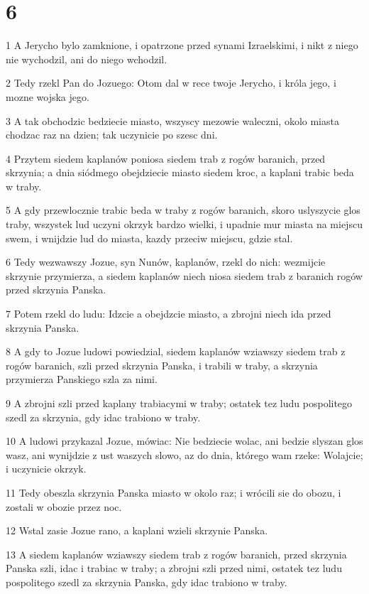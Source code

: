 \chapter{6}

\par 1 A Jerycho bylo zamknione, i opatrzone przed synami Izraelskimi, i nikt z niego nie wychodzil, ani do niego wchodzil.
\par 2 Tedy rzekl Pan do Jozuego: Otom dal w rece twoje Jerycho, i króla jego, i mozne wojska jego.
\par 3 A tak obchodzic bedziecie miasto, wszyscy mezowie waleczni, okolo miasta chodzac raz na dzien; tak uczynicie po szesc dni.
\par 4 Przytem siedem kaplanów poniosa siedem trab z rogów baranich, przed skrzynia; a dnia siódmego obejdziecie miasto siedem kroc, a kaplani trabic beda w traby.
\par 5 A gdy przewlocznie trabic beda w traby z rogów baranich, skoro uslyszycie glos traby, wszystek lud uczyni okrzyk bardzo wielki, i upadnie mur miasta na miejscu swem, i wnijdzie lud do miasta, kazdy przeciw miejscu, gdzie stal.
\par 6 Tedy wezwawszy Jozue, syn Nunów, kaplanów, rzekl do nich: wezmijcie skrzynie przymierza, a siedem kaplanów niech niosa siedem trab z baranich rogów przed skrzynia Panska.
\par 7 Potem rzekl do ludu: Idzcie a obejdzcie miasto, a zbrojni niech ida przed skrzynia Panska.
\par 8 A gdy to Jozue ludowi powiedzial, siedem kaplanów wziawszy siedem trab z rogów baranich, szli przed skrzynia Panska, i trabili w traby, a skrzynia przymierza Panskiego szla za nimi.
\par 9 A zbrojni szli przed kaplany trabiacymi w traby; ostatek tez ludu pospolitego szedl za skrzynia, gdy idac trabiono w traby.
\par 10 A ludowi przykazal Jozue, mówiac: Nie bedziecie wolac, ani bedzie slyszan glos wasz, ani wynijdzie z ust waszych slowo, az do dnia, którego wam rzeke: Wolajcie; i uczynicie okrzyk.
\par 11 Tedy obeszla skrzynia Panska miasto w okolo raz; i wrócili sie do obozu, i zostali w obozie przez noc.
\par 12 Wstal zasie Jozue rano, a kaplani wzieli skrzynie Panska.
\par 13 A siedem kaplanów wziawszy siedem trab z rogów baranich, przed skrzynia Panska szli, idac i trabiac w traby; a zbrojni szli przed nimi, ostatek tez ludu pospolitego szedl za skrzynia Panska, gdy idac trabiono w traby.
